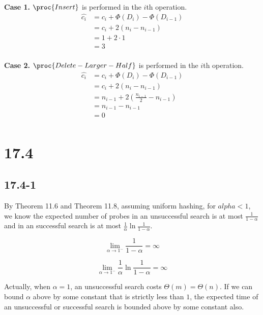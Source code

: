 \textbf{Case 1.}
$\proc{Insert}$ is performed in the $i$th operation.
\begin{equation*}
\begin{split}
    \hat{c_i} & = c_i + \Phi(D_i) - \Phi(D_{i-1}) \\
    & = c_i+ 2(n_i - n_{i-1}) \\
    & = 1 + 2 \cdot 1 \\
    & = 3 \\
\end{split}
\end{equation*}

\textbf{Case 2.}
$\proc{Delete-Larger-Half}$ is performed in the $i$th operation.
\begin{equation*}
\begin{split}
    \hat{c_i} & = c_i + \Phi(D_i) - \Phi(D_{i-1}) \\
    & = c_i + 2(n_i - n_{i-1}) \\
    & = n_{i-1} + 2(\frac{n_{i-1}}{2} - n_{i-1}) \\
    & = n_{i-1} - n_{i-1} \\
    & = 0 \\
\end{split}
\end{equation*}

\section*{17.4}

\subsection*{17.4-1}

By Theorem 11.6 and Theorem 11.8, assuming uniform hashing,
for $alpha < 1$, we know the expected number of probes 
in an unsuccessful search is at most $\frac{1}{1 - \alpha}$
and in an successful search is at most 
$\frac{1}{\alpha} \ln \frac{1}{1 - \alpha}$.

\begin{equation*}
    \lim\limits_{\alpha \rightarrow 1^-} \frac{1}{1 - \alpha} = \infty
\end{equation*}

\begin{equation*}
    \lim\limits_{\alpha \rightarrow 1^-} 
    \frac{1}{\alpha} \ln \frac{1}{1 - \alpha} = \infty
\end{equation*}

Actually, when $\alpha = 1$, an unsuccessful search costs 
$\Theta(m) = \Theta(n)$.
If we can bound $\alpha$ above by some constant 
that is strictly less than $1$,
the expected time of an unsuccessful or successful search is bounded above
by some constant also.

